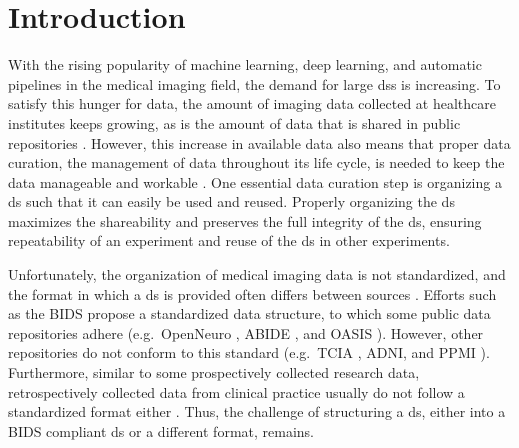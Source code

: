 
\section{Introduction}

With the rising popularity of machine learning, deep learning, and automatic pipelines in the medical imaging field, the demand for large \glspl{ds} is increasing.
To satisfy this hunger for data, the amount of imaging data collected at healthcare institutes keeps growing, as is the amount of data that is shared in public repositories \autocite{greenspan2016guest, lundervold2019overview}.
However, this increase in available data also means that proper data curation, the management of data throughout its life cycle, is needed to keep the data manageable and workable \autocite{prevedello2019challenges, vanooijen2019quality}.
One essential data curation step is organizing a \gls{ds} such that it can easily be used and reused.
Properly organizing the \gls{ds} maximizes the shareability and preserves the full integrity of the \gls{ds}, ensuring repeatability of an experiment and reuse of the \gls{ds} in other experiments.

Unfortunately, the organization of medical imaging data is not standardized, and the format in which a \gls{ds} is provided often differs between sources \autocite{lambin2017radiomics, vanooijen2019quality}.
Efforts such as the \gls{BIDS} \autocite{gorgolewski2016brain} propose a standardized data structure, to which some public data repositories adhere (e.g.\ OpenNeuro \autocite{gorgolewski2017openneuro}, \gls{ABIDE} \autocite{dimartino2017enhancing}, and \gls{OASIS} \autocite{lamontagne2018oasis}).
However, other repositories do not conform to this standard (e.g.\ \gls{TCIA} \autocite{clark2013cancer}, \gls{ADNI}, and \gls{PPMI} \autocite{marek2018parkinson}).
Furthermore, similar to some prospectively collected research data, retrospectively collected data from clinical practice usually do not follow a standardized format either \autocite{vanooijen2019quality}.
Thus, the challenge of structuring a \gls{ds}, either into a \gls{BIDS} compliant \gls{ds} or a different format, remains.

